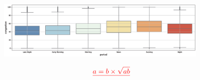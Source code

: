 \DIFdelbegin {}%
\DIFdelend \DIFaddbegin \begin{center}
	\begin{figure}
			\setlength{\abovecaptionskip}{0.1cm} 
			\raggedleft
			\includegraphics[width=10.0cm]{figure/period.eps}
			\centering
			\caption{}
			\label{period}
	\end{figure}
\end{center}
\DIFaddend 

\DIFdelbegin \begin{displaymath}\DIFdel{%
a = b \times \sqrt{ab}
}\end{displaymath}%


\section{} %
\addtocounter{section}{-1}%



\section{} %
\addtocounter{section}{-1}%




